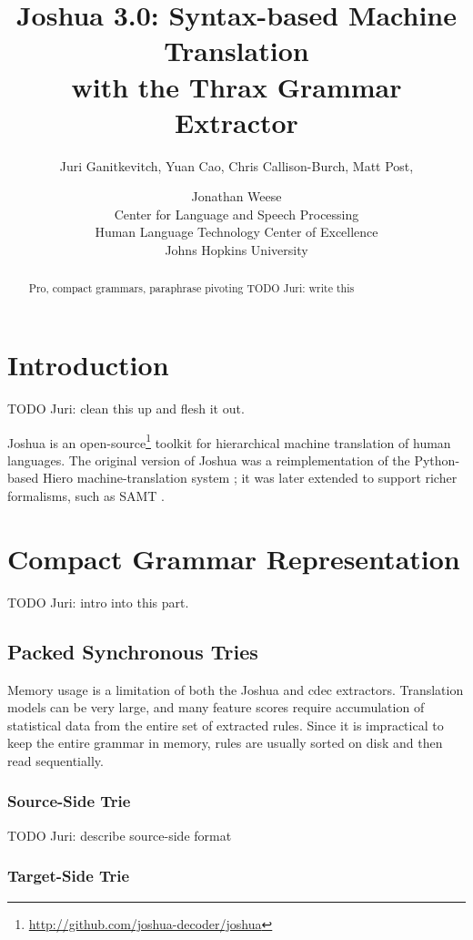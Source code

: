 \documentclass[11pt]{article}
\title{Joshua 3.0: Syntax-based Machine Translation \\ with the Thrax
  Grammar Extractor}
\author{Juri Ganitkevitch\aff, Yuan Cao\aff, Chris
  Callison-Burch\aff, Matt Post\afff, \and Jonathan Weese\aff \\
  \aff Center for Language and Speech Processing \\
  \afff Human Language Technology Center of Excellence \\
  Johns Hopkins University}
\date{}
\begin{document}
\maketitle

\begin{abstract}
  Pro, compact grammars, paraphrase pivoting 
  TODO Juri: write this
\end{abstract}

\section{Introduction}

TODO Juri: clean this up and flesh it out.

Joshua is an
open-source\footnote{\url{http://github.com/joshua-decoder/joshua}}
toolkit for hierarchical machine translation of human languages.  The
original version of Joshua \cite{Joshua-WMT} was a reimplementation of
the Python-based Hiero machine-translation system \cite{Chiang2007};
it was later extended \cite{li2010joshua} to support richer
formalisms, such as SAMT \cite{samt2006}.

\section{Compact Grammar Representation}

TODO Juri: intro into this part.

\subsection{Packed Synchronous Tries}

Memory usage is a limitation of both the Joshua and cdec
extractors. Translation models can be very large, and many feature
scores require accumulation of statistical data from the entire set of
extracted rules. Since it is impractical to keep the entire grammar in
memory, rules are usually sorted on disk and then read sequentially.

\subsubsection{Source-Side Trie}

TODO Juri: describe source-side format

\subsubsection{Target-Side Trie}
\end{document}
